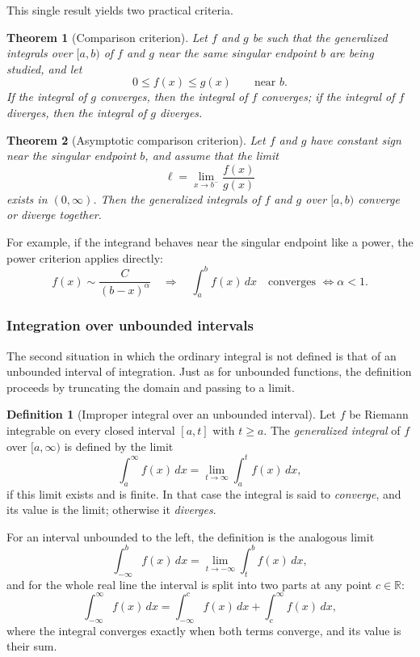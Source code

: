 \documentclass[11pt,a4paper]{article}
\theoremstyle{definition} \newtheorem{definition}{Definition} \theoremstyle{plain} \newtheorem{theorem}{Theorem}
\begin{document}
This single result yields two practical criteria.

\begin{theorem}[Comparison criterion]\label{thm:comparison-integral}
Let $f$ and $g$ be such that the generalized integrals over $[a,b)$ of $f$
and $g$ near the same singular endpoint $b$ are being studied, and let
\[
0 \le f(x) \le g(x) \qquad \text{near } b.
\]
If the integral of $g$ converges, then the integral of $f$ converges; if the
integral of $f$ diverges, then the integral of $g$ diverges.
\end{theorem}

\begin{theorem}[Asymptotic comparison criterion]\label{thm:asymptotic-comparison-integral}
Let $f$ and $g$ have constant sign near the singular endpoint $b$, and assume
that the limit
\[
\ell = \lim_{x\to b^-}\frac{f(x)}{g(x)}
\]
exists in $(0,\infty)$.  Then the generalized integrals of $f$ and $g$ over
$[a,b)$ converge or diverge together.
\end{theorem}

For example, if the integrand behaves near the singular endpoint like a
power, the power criterion applies directly:
\[
f(x)\sim\frac{C}{(b-x)^{\alpha}}
\quad\Longrightarrow\quad
\int_a^b f(x)\,dx
\quad\text{converges } \iff \alpha<1.
\]
\subsubsection{Integration over unbounded intervals}

The second situation in which the ordinary integral is not defined is that of
an unbounded interval of integration.  Just as for unbounded functions, the
definition proceeds by truncating the domain and passing to a limit.

\begin{definition}[Improper integral over an unbounded interval]
Let $f$ be Riemann integrable on every closed interval $[a,t]$ with $t\ge a$.
The \emph{generalized integral} of $f$ over $[a,\infty)$ is defined by the
limit
\[
\int_a^{\infty} f(x)\,dx = \lim_{t\to\infty}\int_a^t f(x)\,dx,
\]
if this limit exists and is finite.  In that case the integral is said to
\emph{converge}, and its value is the limit; otherwise it \emph{diverges}.
\end{definition}

For an interval unbounded to the left, the definition is the analogous limit
\[
\int_{-\infty}^b f(x)\,dx = \lim_{t\to-\infty}\int_t^b f(x)\,dx,
\]
and for the whole real line the interval is split into two parts at any
point $c\in\mathbb{R}$:
\[
\int_{-\infty}^{\infty} f(x)\,dx
    = \int_{-\infty}^c f(x)\,dx + \int_c^{\infty} f(x)\,dx,
\]
where the integral converges exactly when both terms converge, and its value
is their sum.
\end{document}
